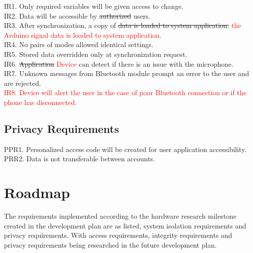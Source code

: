 \documentclass[12pt, titlepage]{article}
\begin{document}
IR1. Only required variables will be given access to change.
\\IR2. Data will be accessible by \sout{authorized} users.
\\ IR3. After synchronization, a copy of \sout{data is loaded to system application.} \textcolor{red}{the Arduino signal data is loaded to system application.}
\\IR4. No pairs of modes allowed identical settings.
\\IR5. Stored data overridden only at synchronization request.
\\IR6. \sout{Application} \textcolor{red}{Device} can detect if there is an issue with the microphone.
\\IR7. Unknown messages from Bluetooth module prompt an error to the user and are rejected.
\\\textcolor{red}{IR8. Device will alert the user in the case of poor Bluetooth connection or if the phone has disconnected.}
\subsection{Privacy Requirements}

PPR1. Personalized access code will be created for user application accessibility. 
\\PRR2. Data is not transferable between accounts.


\section{Roadmap}

The requirements implemented according to the hardware research milestone created in the development plan are as listed, system isolation requirements and privacy requirements. With access requirements, integrity requirements and privacy requirements being researched in the future development plan.
\end{document}
